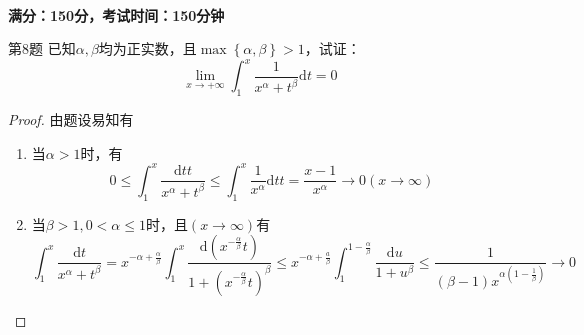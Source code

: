 \begin{center}
	{\erhao {} }\\
	\vspace{0.2cm}
	{\sihao \textbf{满分：150分，考试时间：150分钟} }\\
	\vspace{0.3cm}
\end{center}

\begin{smybox}[colbacktitle=green!25!black!10!white]{第8题}
	已知$\alpha,\beta$均为正实数，且$\max\left\{\alpha ,\beta\right\}>1$，试证：
	\[
	\lim_{x\rightarrow +\infty}\int_1^x{\frac{1}{x^{\alpha}+t^{\beta}}}\mathrm{d}t=0
	\]
\begin{proof}由题设易知有
	\begin{enumerate} 
		\item 当$\alpha>1$时，有
		\[
		0 \leq \int_{1}^{x} \frac{\mathrm{d}t t}{x^{\alpha}+t^{\beta}} \leq \int_{1}^{x} \frac{1}{x^{\alpha}} \mathrm{d}tt=\frac{x-1}{x^{\alpha}} \rightarrow 0(x \rightarrow \infty)
		\]
		\item 当$\beta>1,0<\alpha \leq 1$时，且$\left(x\rightarrow\infty\right)$有
		\[
		\int_1^x{\frac{\mathrm{d}t}{x^{\alpha}+t^{\beta}}}=x^{-\alpha +\frac{\alpha}{\beta}}\int_1^x{\frac{\mathrm{d}\left(x^{-\frac{\alpha}{\beta}}t\right)}{1+\left(x^{-\frac{\alpha}{\beta}}t\right)^{\beta}}}\leq x^{-\alpha +\frac{a}{\beta}}\int_1^{1-\frac{\alpha}{\beta}}{\frac{\mathrm{d}u}{1+u^{\beta}}}\leq\frac{1}{\left(\beta -1\right)x^{\alpha\left(1-\frac{1}{\beta}\right)}}\rightarrow 0
		\]
	\end{enumerate}
\end{proof}
\end{smybox}

